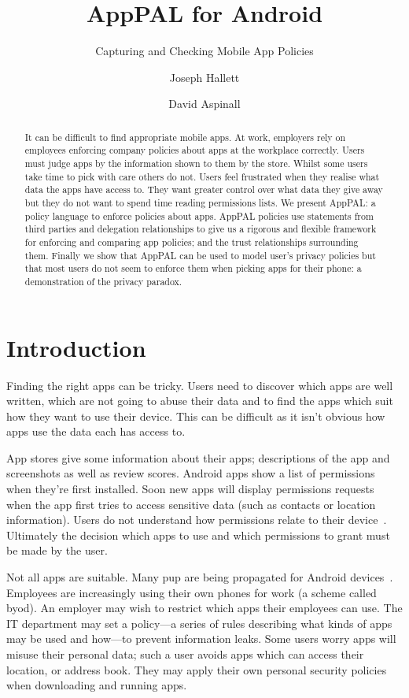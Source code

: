\documentclass[]{llncs}
\title{AppPAL for Android}
\subtitle{Capturing and Checking Mobile App Policies}
\author{Joseph Hallett \and David Aspinall }
\institute{University of Edinburgh}
\newcommand{\comment}[1]{}%
\begin{document}
\maketitle{}

\begin{abstract}
  It can be difficult to find appropriate mobile apps.
  At work, employers rely on employees enforcing company policies about apps at the workplace correctly.
  Users must judge apps by the information shown to them by the store.
  Whilst some users take time to pick with care others do not.
  Users feel frustrated when they realise what data the apps have access to.
  They want greater control over what data they give away but they do not want to spend time reading permissions lists.
  We present AppPAL: a policy language to enforce policies about apps.
  AppPAL policies use statements from third parties and delegation relationships to give us a rigorous and flexible framework for enforcing and comparing app policies; and the trust relationships surrounding them.
  Finally we show that AppPAL can be used to model user's privacy policies but that most users do not seem to enforce them when picking apps for their phone: a demonstration of the privacy paradox.
\end{abstract}

\section{Introduction \comment{1 page}}
\label{sec:introduction}

Finding the right apps can be tricky.
Users need to discover which apps are well written, which are not going to abuse their data
  and to find the apps which suit how they want to use their device.
This can be difficult as it isn't obvious how apps use the data each has access to.

App stores give some information about their apps; descriptions of the app and screenshots as well as review scores.
Android apps show a list of permissions when they're first installed.
Soon new apps will display permissions requests when the app first tries to access sensitive data (such as contacts or location information).
Users do not understand how permissions relate to their device~\cite{Felt:2012hm,Thompson:2013eb}.
Ultimately the decision which apps to use and which permissions to grant must be made by the user.

Not all apps are suitable.
Many \ac{pup} are being propagated for Android devices~\cite{Truong:2014bi,Svajcer:2013tp}.
Employees are increasingly using their own phones for work (a scheme called \ac{byod}).
An employer may wish to restrict which apps their employees can use.
The IT department may set a policy---a series of rules describing what kinds of apps may be used and how---to prevent information leaks.
Some users worry apps will misuse their personal data;
  such a user avoids apps which can access their location, or address book.
They may apply their own personal security policies when downloading and running apps.
\end{document}
